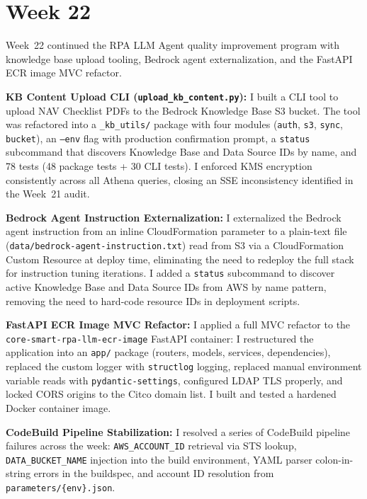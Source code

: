 \FloatBarrier

\section{Week 22}
\label{sec:week22}

Week~22 continued the RPA LLM Agent quality improvement program with knowledge base
upload tooling, Bedrock agent externalization, and the FastAPI ECR
image MVC refactor.

\textbf{KB Content Upload CLI (\texttt{upload\_kb\_content.py}):} 
I built a
CLI tool to upload NAV Checklist PDFs to the Bedrock Knowledge
Base S3 bucket. The tool was refactored into a \texttt{\_kb\_utils/}
package with four modules (\texttt{auth}, \texttt{s3}, \texttt{sync},
\texttt{bucket}), an \texttt{--env} flag with production confirmation
prompt, a \texttt{status} subcommand that discovers Knowledge Base and
Data Source IDs by name, and 78 tests (48 package tests + 30 CLI tests).
I enforced KMS encryption consistently across all Athena queries, closing
an SSE inconsistency identified in the Week~21 audit.

\textbf{Bedrock Agent Instruction Externalization:} 
I externalized the Bedrock agent
instruction from an inline CloudFormation parameter to
a plain-text file (\texttt{data/bedrock-agent-instruction.txt}) read
from S3 via a CloudFormation Custom Resource at deploy time, eliminating the
need to redeploy the full stack for instruction tuning iterations.
I added a \texttt{status} subcommand to discover active Knowledge Base
and Data Source IDs from AWS by name pattern, removing the need to
hard-code resource IDs in deployment scripts.

\textbf{FastAPI ECR Image MVC Refactor:} 
I applied a full MVC refactor to the \texttt{core-smart-rpa-llm-ecr-image}
FastAPI container: I restructured the application into an \texttt{app/} package (routers, models, services,
dependencies), replaced the custom logger with \texttt{structlog} logging,
replaced manual environment variable reads with \texttt{pydantic-settings},
configured LDAP TLS properly, and locked CORS origins to the
Citco domain list. I built and tested a hardened Docker container image.

\textbf{CodeBuild Pipeline Stabilization:} 
I resolved a series of CodeBuild pipeline
failures across the week: \texttt{AWS\_ACCOUNT\_ID} retrieval
via STS lookup, \texttt{DATA\_BUCKET\_NAME} injection into the build
environment, YAML parser colon-in-string errors in the buildspec, and
account ID resolution from \texttt{parameters/\{env\}.json}.

